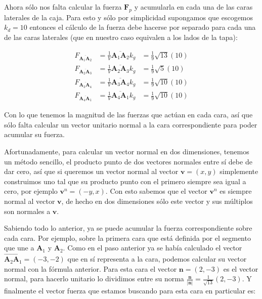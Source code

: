 Ahora sólo nos falta calcular la fuerza $\textbf{F}_p$ y acumularla en cada una de las caras laterales de la caja. Para esto y sólo por simplicidad supongamos que escogemos $k_d = 10$ entonces el cálculo de la fuerza debe hacerse por separado para cada una de las caras laterales (que en nuestro caso equivalen a los lados de la tapa):

\begin{eqnarray}
F_{\overline{\textbf{A}_1 \textbf{A}_2}} & =  \frac{1}{V}\overline{\textbf{A}_1 \textbf{A}_2} k_g & = \frac{1}{9} \sqrt{13} \left( 10 \right) \nonumber \\
F_{\overline{\textbf{A}_2 \textbf{A}_3}} & =  \frac{1}{V}\overline{\textbf{A}_2 \textbf{A}_3} k_g & = \frac{1}{9} \sqrt{5}  \left( 10 \right) \nonumber \\
F_{\overline{\textbf{A}_3 \textbf{A}_4}} & =  \frac{1}{V}\overline{\textbf{A}_3 \textbf{A}_4} k_g & = \frac{1}{9} \sqrt{10} \left( 10 \right) \nonumber \\
F_{\overline{\textbf{A}_4 \textbf{A}_1}} & =  \frac{1}{V}\overline{\textbf{A}_4 \textbf{A}_1} k_g & = \frac{1}{9} \sqrt{10} \left( 10 \right) \nonumber
\end{eqnarray}

Con lo que tenemos la magnitud de las fuerzas que actúan en cada cara, así que sólo falta calcular un vector unitario normal a la cara correspondiente para poder acumular su fuerza.

Afortunadamente, para calcular un vector normal en dos dimensiones, tenemos un método sencillo, el producto punto de dos vectores normales entre sí debe de dar cero, así que si queremos un vector normal al vector $\textbf{v}=(x, y)$ simplemente construimos uno tal que su producto punto con el primero siempre sea igual a cero, por ejemplo $\textbf{v}^n = (-y, x)$.
Con esto sabemos que el vector $\textbf{v}^n$ es siempre normal al vector $\textbf{v}$, de hecho en dos dimensiones sólo este vector y sus múltiplos son normales a $\textbf{v}$.

Sabiendo todo lo anterior, ya se puede acumular la fuerza correspondiente sobre cada cara. Por ejemplo, sobre la primera cara que está definida por el segmento que une a $\textbf{A}_1$ y $\textbf{A}_2$.
Como en el paso anterior ya se había calculado el vector $\overrightarrow{\textbf{A}_2 \textbf{A}_1} = (-3,-2)$ que en sí representa a la cara, podemos calcular su vector normal con la fórmula anterior.
Para esta cara el vector $\textbf{n}=(2,-3)$ es el vector normal, para hacerlo unitario lo dividimos entre su norma $\frac{\textbf{n}}{|\textbf{n}|} = \frac{1}{\sqrt{13}} (2, -3)$.
Y finalmente el vector fuerza que estamos buscando para esta cara en particular es:

